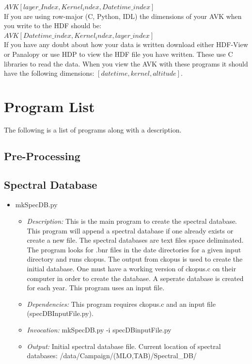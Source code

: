 \documentclass[12pt, letterpaper]{article}
\begin{document}
$AVK[ layer\_Index, Kernel_index, Datetime\_index ]$\\

If you are using row-major (C, Python, IDL) the dimensions of your AVK when you write to the HDF should be:\\

$AVK[ Datetime\_index, Kernel_index, layer\_index ]$\\

 
If you have any doubt about how your data is written download either HDF-View or Panalopy or use HDP to view the HDF file you have written. These use C libraries to read the data. When you view the AVK with these programs it should have the following dimensions:  $[datetime, kernel, altitude]$.

\section{Program List}
The following is a list of programs along with a description.

\subsection{Pre-Processing}
\subsection{Spectral Database}
\begin{itemize}
\item mkSpecDB.py
\begin{itemize}
\item \textit{Description:} This is the main program to create the spectral database. This program will append a spectral database if one already exists or create a new file. The spectral databases are text files space deliminated. The program looks for .bnr files in the date directories for a given input directory and runs ckopus. The output from ckopus is used to create the initial database. One must have a working version of ckopus.c on their computer in order to create the database. A seperate database is created for each year. This program uses an input file.
\item \textit{Dependencies:} This program requires ckopus.c and an input file (specDBInputFile.py).
\item \textit{Invocation:} mkSpecDB.py -i specDBinputFile.py
\item \textit{Output:} Initial spectral database file. Current location of spectral databases: /data/Campaign/(MLO,TAB)/Spectral\_DB/
\end{itemize}
\end{itemize}
\end{document}
